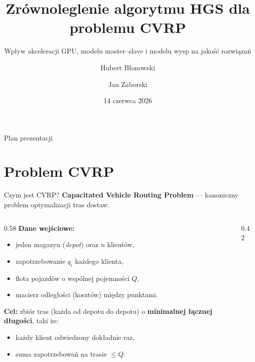 \documentclass[aspectratio=169,11pt]{beamer}
\title[Zrównoleglenie HGS-CVRP]{Zrównoleglenie algorytmu HGS dla problemu CVRP}
\subtitle{Wpływ akceleracji GPU, modelu master--slave i modelu wysp na jakość rozwiązań}
\author[Blonowski, Zaborski]{Hubert Błonowski \and Jan Zaborski}
\date{14 czerwca 2026}
\begin{document}
\begin{frame}[plain]
  \titlepage
\end{frame}

\begin{frame}{Plan prezentacji}
  \tableofcontents
\end{frame}

\section{Problem CVRP}
\begin{frame}{Czym jest CVRP?}
  \textbf{Capacitated Vehicle Routing Problem} — kanoniczny problem optymalizacji tras dostaw.
  \vfill
  \begin{columns}[T]
    \begin{column}{0.58\textwidth}
      \textbf{Dane wejściowe:}
      \begin{itemize}
        \item jeden magazyn (\emph{depot}) oraz $n$ klientów,
        \item zapotrzebowanie $q_i$ każdego klienta,
        \item flota pojazdów o wspólnej pojemności $Q$,
        \item macierz odległości (kosztów) między punktami.
      \end{itemize}
      \vspace{0.4em}
      \textbf{Cel:} zbiór tras (każda od depotu do depotu) o \textbf{minimalnej łącznej długości}, taki że:
      \begin{itemize}
        \item każdy klient odwiedzony dokładnie raz,
        \item suma zapotrzebowań na trasie $\le Q$.
      \end{itemize}
    \end{column}
    \begin{column}{0.42\textwidth}
      \centering
      \par\vspace{0.3em}{\scriptsize Trzy trasy obsługujące sześciu klientów.}
    \end{column}
  \end{columns}
\end{frame}
\end{document}
